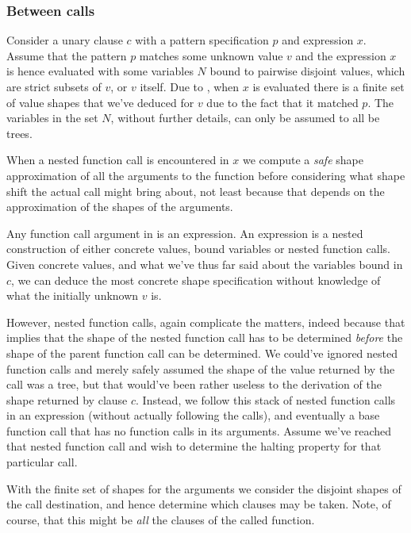 \subsubsection{Between calls}

Consider a unary clause $c$ with a pattern specification $p$ and expression
$x$. Assume that the pattern $p$ matches some unknown value $v$ and the
expression $x$ is hence evaluated with some variables $N$ bound to pairwise
disjoint values, which are strict subsets of $v$, or $v$ itself. Due to
, when $x$ is evaluated there is a finite
set of value shapes that we've deduced for $v$ due to the fact that it matched
$p$. The variables in the set $N$, without further details, can only be assumed
to all be trees.

When a nested function call is encountered in $x$ we compute a \emph{safe}
shape approximation of all the arguments to the function before considering
what shape shift the actual call might bring about, not least because that
depends on the approximation of the shapes of the arguments.

Any function call argument in \D{} is an expression. An expression is a nested
construction of either concrete values, bound variables or nested function
calls. Given concrete values, and what we've thus far said about the variables
bound in $c$, we can deduce the most concrete shape specification without
knowledge of what the initially unknown $v$ is.

However, nested function calls, again complicate the matters, indeed because
that implies that the shape of the nested function call has to be determined
\emph{before} the shape of the parent function call can be determined. We
could've ignored nested function calls and merely safely assumed the shape of
the value returned by the call was a tree, but that would've been rather
useless to the derivation of the shape returned by clause $c$. Instead, we
follow this stack of nested function calls in an expression (without actually
following the calls), and eventually a base function call that has no function
calls in its arguments. Assume we've reached that nested function call and wish
to determine the halting property for that particular call.

With the finite set of shapes for the arguments we consider the disjoint shapes
of the call destination, and hence determine which clauses may be taken. Note,
of course, that this might be \emph{all} the clauses of the called function.

